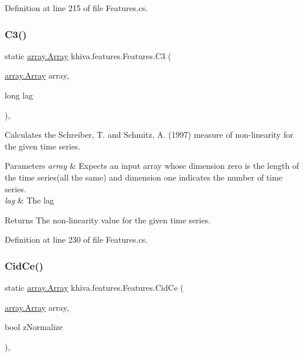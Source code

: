 Definition at line 215 of file Features.\+cs.

\mbox{\label{classkhiva_1_1features_1_1_features_a462639f20b7a0c7cac1522cbaa0d2122}} 
\subsubsection{\texorpdfstring{C3()}{C3()}}
{\footnotesize\ttfamily static \mbox{\hyperlink{classkhiva_1_1array_1_1_array}{array.\+Array}} khiva.\+features.\+Features.\+C3 (\begin{DoxyParamCaption}\item[{\mbox{\hyperlink{classkhiva_1_1array_1_1_array}{array.\+Array}}}]{array,  }\item[{long}]{lag }\end{DoxyParamCaption})\hspace{0.3cm}{\ttfamily [inline]}, {\ttfamily [static]}}



Calculates the Schreiber, T. and Schmitz, A. (1997) measure of non-\/linearity for the given time series. 


\begin{DoxyParams}{Parameters}
{\em array} & Expects an input array whose dimension zero is the length of the time series(all the same) and dimension one indicates the number of time series.\\
\hline
{\em lag} & The lag\\
\hline
\end{DoxyParams}
\begin{DoxyReturn}{Returns}
The non-\/linearity value for the given time series.
\end{DoxyReturn}


Definition at line 230 of file Features.\+cs.

\mbox{\label{classkhiva_1_1features_1_1_features_a06e07fc2169ecd94fbf7f21b407a683d}} 
\subsubsection{\texorpdfstring{Cid\+Ce()}{CidCe()}}
{\footnotesize\ttfamily static \mbox{\hyperlink{classkhiva_1_1array_1_1_array}{array.\+Array}} khiva.\+features.\+Features.\+Cid\+Ce (\begin{DoxyParamCaption}\item[{\mbox{\hyperlink{classkhiva_1_1array_1_1_array}{array.\+Array}}}]{array,  }\item[{bool}]{z\+Normalize }\end{DoxyParamCaption})\hspace{0.3cm}{\ttfamily [inline]}, {\ttfamily [static]}}



